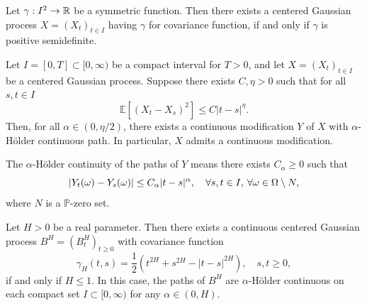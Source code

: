 \begin{thm}\label{kolmogorov}
    Let $\gamma: I^{2}\to\mathbb{R}$ be a symmetric function. Then there exists a centered Gaussian process $X=(X_{t})_{t\in I}$ having $\gamma$ for covariance function, if and only if $\gamma$ is positive semidefinite.
\end{thm}
\begin{lem}
    Let $I=[0,T]\subset [0,\infty)$ be a compact interval for $T>0$, and let $X=(X_{t})_{t\in I}$ be a centered Gaussian process. Suppose there exists $C,\eta>0$ such that for all $s,t\in I$
    \begin{equation}
        \mathbb{E}\left[(X_{t}-X_{s})^{2}\right]\leq C|t-s|^{\eta}.
    \end{equation}
    Then, for all $\alpha\in (0,\eta/2)$, there exists a continuous modification $Y$ of $X$ with $\alpha$-Hölder continuous path. In particular, $X$ admits a continuous modification.
\end{lem}
The $\alpha$-Hölder continuity of the paths of $Y$ means there exists $C_{\alpha}\geq 0$ such that
\begin{equation}
    |Y_{t}(\omega)-Y_{s}(\omega)|\leq C_{\alpha}|t-s|^{\alpha},\quad \forall s,t\in I,\hspace{2 pt}\forall\omega\in\Omega\setminus N,
\end{equation}
where $N$ is a $\mathbb{P}$-zero set.
\begin{thm}\label{existencethm}
  Let $H>0$ be a real parameter. Then there exists a continuous centered Gaussian process $B^{H}=(B_{t}^{H})_{t\geq 0}$ with covariance function
  \begin{equation}
      \gamma_{H}(t,s)=\frac{1}{2}(t^{2H}+s^{2H}-|t-s|^{2H}), \quad s,t\geq 0,
  \end{equation}
  if and only if $H\leq 1$. In this case, the paths of $B^{H}$ are $\alpha$-Hölder continuous on each compact set $I\subset [0,\infty)$ for any $\alpha\in (0,H)$.
\end{thm}

